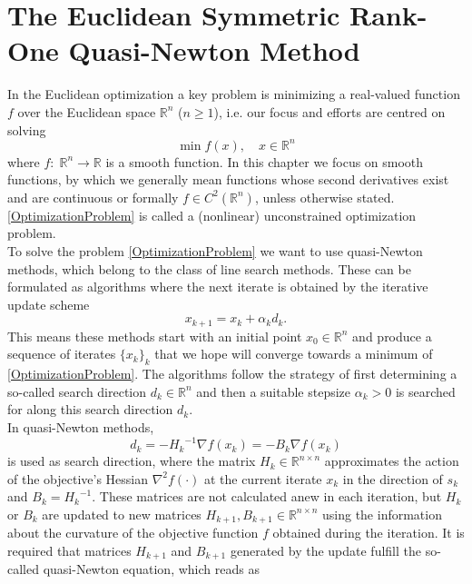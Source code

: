 \chapter{The Euclidean Symmetric Rank-One Quasi-Newton Method}

In the Euclidean optimization a key problem is minimizing a real-valued function $f$ over the Euclidean space $\mathbb{R}^n$ ($n \geq 1$), i.e. our focus and efforts are centred on solving 
\begin{equation}\label{OptimizationProblem}
    \min f(x), \quad x \in \mathbb{R}^n
\end{equation}  
where $f \colon \; \mathbb{R}^n \to \mathbb{R}$ is a smooth function. In this chapter we focus on smooth functions, by which we generally mean functions whose second derivatives exist and are continuous or formally $f \in C^2(\mathbb{R}^n)$, unless otherwise stated. \cref{OptimizationProblem} is called a (nonlinear) unconstrained optimization problem. \\
To solve the problem \cref{OptimizationProblem} we want to use quasi-Newton methods, which belong to the class of line search methods. These can be formulated as algorithms where the next iterate is obtained by the iterative update scheme
\begin{equation*}
    x_{k+1} = x_k + \alpha_k d_k.
\end{equation*}
This means these methods start with an initial point $x_0 \in \mathbb{R}^n$ and produce a sequence of iterates $\{x_k\}_k$ that we hope will converge towards a minimum of \cref{OptimizationProblem}. The algorithms follow the strategy of first determining a so-called search direction $d_k \in \mathbb{R}^n$ and then a suitable stepsize $\alpha_k > 0$ is searched for along this search direction $d_k$. \\
In quasi-Newton methods, 
\begin{equation*}
    d_k = -{H_k}^{-1} \nabla f(x_k) = -B_k \nabla f(x_k)
\end{equation*}
is used as search direction, where the matrix $H_k \in \mathbb{R}^{n \times n}$ approximates the action of the objective's Hessian $\nabla^{2} f(\cdot)$ at the current iterate $x_k$ in the direction of $s_k$ and $B_k = {H_k}^{-1}$. These matrices are not calculated anew in each iteration, but $H_k$ or $B_k$ are updated to new matrices $H_{k+1}, B_{k+1} \in \mathbb{R}^{n \times n}$ using the information about the curvature of the objective function $f$ obtained during the iteration. It is required that matrices $H_{k+1}$ and $B_{k+1}$ generated by the update fulfill the so-called quasi-Newton equation, which reads as 
